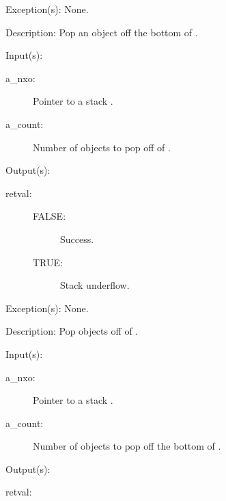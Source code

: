 \begin{capi}
\begin{capilist}
	\item[Exception(s): ] None.
	\item[Description: ]
		Pop an object off the bottom of .
	\end{capilist}
\label{nxo_stack_npop}
	\begin{capilist}
	\item[Input(s): ]
		\begin{description}\item[]
		\item[a\_nxo: ]
			Pointer to a stack .
		\item[a\_count: ]
			Number of objects to pop off of .
		\end{description}
	\item[Output(s): ]
		\begin{description}\item[]
		\item[retval: ]
			\begin{description}\item[]
			\item[FALSE: ]
				Success.
			\item[TRUE: ]
				Stack underflow.
			\end{description}
		\end{description}
	\item[Exception(s): ] None.
	\item[Description: ]
		Pop  objects off of .
	\end{capilist}
\label{nxo_stack_nbpop}
	\begin{capilist}
	\item[Input(s): ]
		\begin{description}\item[]
		\item[a\_nxo: ]
			Pointer to a stack \classname{nxo}.
		\item[a\_count: ]
			Number of objects to pop off the bottom of
			\cvar{a\_nxo}.
		\end{description}
	\item[Output(s): ]
		\begin{description}\item[]
		\item[retval: ]

\end{description}
\end{capilist}
\end{capi}
